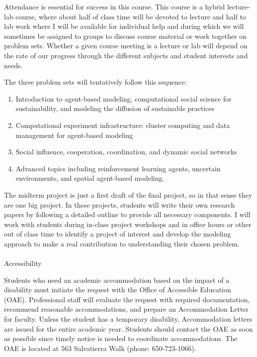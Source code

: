 \documentclass[
  letterpaper,
  DIV=11,
  numbers=noendperiod]{scrartcl}
\makeatletter
\let\oldparagraph\paragraph
\renewcommand{\paragraph}{
    \@ifstar
      \xxxParagraphStar
      \xxxParagraphNoStar
  }
\newcommand{\xxxParagraphStar}[1]{\oldparagraph*{#1}\mbox{}}
\newcommand{\xxxParagraphNoStar}[1]{\oldparagraph{#1}\mbox{}}
\providecommand{\tightlist}{%
  \setlength{\itemsep}{0pt}\setlength{\parskip}{0pt}}\usepackage{longtable,booktabs,array}
\makeatother
\begin{document}
Attendance is essential for success in this course. This course is a
hybrid lecture-lab course, where about half of class time will be
devoted to lecture and half to lab work where I will be available for
individual help and during which we will sometimes be assigned to groups
to discuss course material or work together on problem sets. Whether a
given course meeting is a lecture or lab will depend on the rate of our
progress through the different subjects and student interests and needs.

The three problem sets will tentatively follow this sequence:

\begin{enumerate}
\def\labelenumi{\arabic{enumi}.}
\tightlist
\item
  Introduction to agent-based modeling, computational social science for
  sustainability, and modeling the diffusion of sustainable practices
\item
  Computational experiment infrastructure: cluster computing and data
  management for agent-based modeling
\item
  Social influence, cooperation, coordination, and dynamic social
  networks
\item
  Advanced topics including reinforcement learning agents, uncertain
  environments, and spatial agent-based modeling.
\end{enumerate}

The midterm project is just a first draft of the final project, so in
that sense they are one big project. In these projects, students will
write their own research papers by following a detailed outline to
provide all necessary components. I will work with students during
in-class project workshops and in office hours or other out of class
time to identify a project of interest and develop the modeling approach
to make a real contribution to understanding their chosen problem.

\paragraph{Accessibility}\label{accessibility}

Students who need an academic accommodation based on the impact of a
disability must initiate the request with the Office of Accessible
Education (OAE). Professional staff will evaluate the request with
required documentation, recommend reasonable accommodations, and prepare
an Accommodation Letter for faculty. Unless the student has a temporary
disability, Accommodation letters are issued for the entire academic
year. Students should contact the OAE as soon as possible since timely
notice is needed to coordinate accommodations. The OAE is located at 563
Salvatierra Walk (phone: 650-723-1066).
\end{document}
